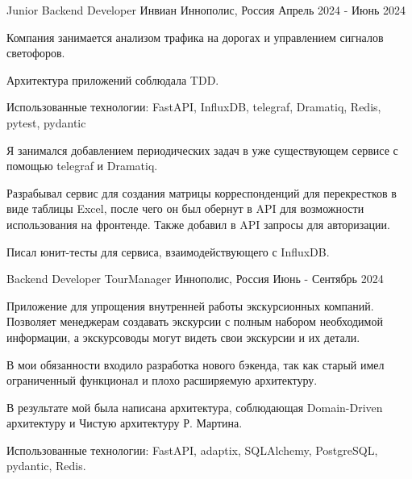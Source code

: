 \begin{cventries}
  \cventry
    {Junior Backend Developer} %
    {Инвиан} %
    {Иннополис, Россия} %
    {Апрель 2024 - Июнь 2024} %
    {
      \begin{cvitems} %
        \item {Компания занимается анализом трафика на дорогах и управлением сигналов светофоров. }
        \item {Архитектура приложений соблюдала TDD. }
        \item {Использованные технологии: FastAPI, InfluxDB, telegraf, Dramatiq, Redis, pytest, pydantic }
        \item {Я занимался добавлением периодических задач в уже существующем сервисе с помощью telegraf и Dramatiq. }
        \item {Разрабывал сервис для создания матрицы корреспонденций для перекрестков в виде таблицы Excel, после чего он был обернут в API для возможности использования на фронтенде. Также добавил в API запросы для авторизации. }
        \item {Писал юнит-тесты для сервиса, взаимодействующего с InfluxDB. }
      \end{cvitems}
    }
  
  \cventry
  {Backend Developer} %
  {TourManager} %
  {Иннополис, Россия} %
  {Июнь - Сентябрь 2024} %
  {
    \begin{cvitems} %
      \item {Приложение для упрощения внутренней работы экскурсионных компаний. Позволяет менеджерам создавать экскурсии с полным набором необходимой информации, а экскурсоводы могут видеть свои экскурсии и их детали. }
      \item {В мои обязанности входило разработка нового бэкенда, так как старый имел ограниченный функционал и плохо расширяемую архитектуру.}
      \item {В результате мой была написана архитектура, соблюдающая Domain-Driven архитектуру и Чистую архитектуру Р. Мартина. }
      \item {Использованные технологии: FastAPI, adaptix, SQLAlchemy, PostgreSQL, pydantic, Redis. }
    \end{cvitems}
  }
\end{cventries}
